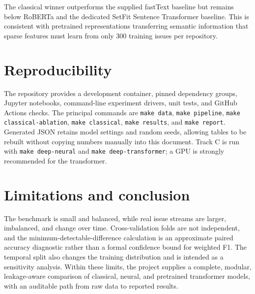 \documentclass[11pt,a4paper]{article}
\newcommand{\code}[1]{\texttt{#1}}
\begin{document}
\begin{table}[ht]
\centering
\caption{Selected model on the official holdout split.}

\end{table}

The classical winner outperforms the supplied fastText baseline but remains
below RoBERTa and the dedicated SetFit Sentence Transformer baseline. This is
consistent with pretrained representations transferring semantic information
that sparse features must learn from only 300 training issues per repository.

\begin{table}[ht]
\centering
\caption{Comparison with the supplied locally reproduced baselines.}

\end{table}

\begin{table}[ht]
\centering
\caption{Bootstrap interval and approximate power diagnostic.}

\end{table}

\begin{table}[ht]
\centering
\caption{Matched random and chronological robustness evaluation.}

\end{table}

\section{Reproducibility}
The repository provides a development container, pinned dependency groups,
Jupyter notebooks, command-line experiment drivers, unit tests, and GitHub
Actions checks. The principal commands are \code{make data},
\code{make pipeline}, \code{make classical-ablation}, \code{make classical},
\code{make results}, and \code{make report}. Generated JSON retains model
settings and random seeds, allowing tables to be rebuilt without copying
numbers manually into this document. Track C is run with
\code{make deep-neural} and \code{make deep-transformer}; a GPU is strongly
recommended for the transformer.

\section{Limitations and conclusion}
The benchmark is small and balanced, while real issue streams are larger,
imbalanced, and change over time. Cross-validation folds are not independent,
and the minimum-detectable-difference calculation is an approximate paired
accuracy diagnostic rather than a formal confidence bound for weighted F1.
The temporal split also changes the training distribution and is intended as a
sensitivity analysis. Within these limits, the project supplies a complete,
modular, leakage-aware comparison of classical, neural, and pretrained
transformer models, with an auditable path from raw data to reported results.
\end{document}
